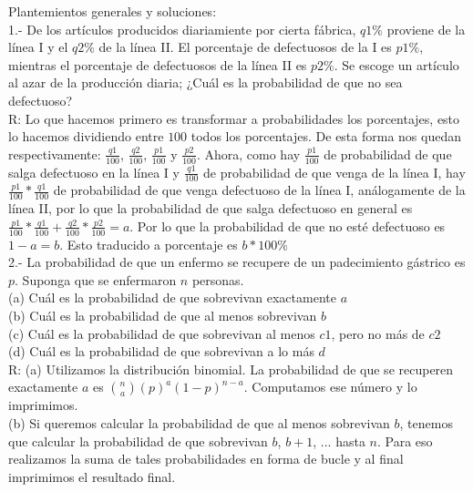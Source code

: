 \documentclass{article}
\begin{document}
Plantemientos generales y soluciones:\\

1.- De los artículos producidos diariamiente por cierta fábrica, $q1 \%$ proviene de la línea I y el $q2 \%$ de la línea II. El porcentaje de defectuosos de la I es $p1 \%$, mientras el porcentaje de defectuosos de la línea II es $p2 \%$. Se escoge un artículo al azar de la producción diaria; ¿Cuál es la probabilidad de que no sea defectuoso?\\

R: Lo que hacemos primero es transformar a probabilidades los porcentajes, esto lo hacemos dividiendo entre $100$ todos los porcentajes. De esta forma nos quedan respectivamente: $\frac{q1}{100}$, $\frac{q2}{100}$, $\frac{p1}{100}$ y $\frac{p2}{100}$. Ahora, como hay $\frac{p1}{100}$ de probabilidad de que salga defectuoso en la línea I y  $\frac{q1}{100}$ de probabilidad de que venga de la línea I, hay $\frac{p1}{100}*\frac{q1}{100}$ de probabilidad de que venga defectuoso de la línea I, análogamente de la línea II, por lo que la probabilidad de que salga defectuoso en general es $\frac{p1}{100}*\frac{q1}{100} + \frac{q2}{100}*\frac{p2}{100} = a$. Por lo que la probabilidad de que no esté defectuoso es $1-a = b$. Esto traducido a porcentaje es $b*100\%$\\

2.- La probabilidad de que un enfermo se recupere de un padecimiento gástrico es $p$. Suponga que se enfermaron $n$ personas.\\
(a) Cuál es la probabilidad de que sobrevivan exactamente $a$\\
(b) Cuál es la probabilidad de que al menos sobrevivan $b$\\
(c) Cuál es la probabilidad de que sobrevivan al menos $c1$, pero no más de $c2$\\
(d) Cuál es la probabilidad de que sobrevivan a lo más $d$\\

R: (a) Utilizamos la distribución binomial. La probabilidad de que se recuperen exactamente $a$ es ${n}\choose{a} $$(p)^{a}(1-p)^{n-a}$. Computamos ese número y lo imprimimos. \\

(b) Si queremos calcular la probabilidad de que al menos sobrevivan $b$, tenemos que calcular la probabilidad de que sobrevivan $b$, $b+1$, ... hasta $n$. Para eso realizamos la suma de tales probabilidades en forma de bucle y al final imprimimos el resultado final. \\
\end{document}
